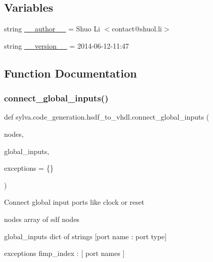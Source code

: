 \subsection*{Variables}
\begin{DoxyCompactItemize}
\item 
string \hyperlink{namespacesylva_1_1code__generation_1_1hsdf__to__vhdl_ae3bc1b6b45064dcd26934de897ca43ce}{\+\_\+\+\_\+author\+\_\+\+\_\+} = \textquotesingle{}Shuo Li $<$contact@shuol.\+li$>$\textquotesingle{}
\item 
string \hyperlink{namespacesylva_1_1code__generation_1_1hsdf__to__vhdl_a75916eaf9006c0cce223480e45896984}{\+\_\+\+\_\+version\+\_\+\+\_\+} = \textquotesingle{}2014-\/06-\/12-\/11\+:47\textquotesingle{}
\end{DoxyCompactItemize}


\subsection{Function Documentation}
\mbox{\label{namespacesylva_1_1code__generation_1_1hsdf__to__vhdl_a4a40923ef153cf1f1a9da0c742b2e542}} 
\subsubsection{\texorpdfstring{connect\+\_\+global\+\_\+inputs()}{connect\_global\_inputs()}}
{\footnotesize\ttfamily def sylva.\+code\+\_\+generation.\+hsdf\+\_\+to\+\_\+vhdl.\+connect\+\_\+global\+\_\+inputs (\begin{DoxyParamCaption}\item[{}]{nodes,  }\item[{}]{global\+\_\+inputs,  }\item[{}]{exceptions = {\ttfamily \{\}} }\end{DoxyParamCaption})}

\begin{DoxyVerb}Connect global input ports like clock or reset

  nodes
    array of sdf nodes

  global_inputs
    dict of strings
    [port name : port type]

  exceptions
    { fimp_index : [ port names ] }
\end{DoxyVerb}
 

